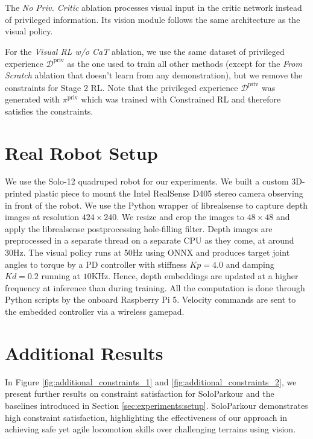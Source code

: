 The \textit{No Priv. Critic} ablation processes visual input in the critic network instead of privileged information.
Its vision module follows the same architecture as the visual policy.

For the \textit{Visual RL w/o CaT} ablation, we use the same dataset of privileged experience $\mathcal{D}^\text{priv}$ as the one used to train all other methods (except for the \textit{From Scratch} ablation that doesn't learn from any demonstration), but we remove the constraints for Stage 2 RL.
Note that the privileged experience $\mathcal{D}^\text{priv}$ was generated with $\pi^\text{priv}$ which was trained with Constrained RL and therefore satisfies the constraints.



\section{Real Robot Setup}
We use the Solo-12 quadruped robot for our experiments.
We built a custom 3D-printed plastic piece to mount the Intel RealSense D405 stereo camera observing in front of the robot.
We use the Python wrapper of librealsense to capture depth images at resolution $424 \times 240$.
We resize and crop the images to $48 \times 48$ and apply the librealsense postprocessing hole-filling filter.
Depth images are preprocessed in a separate thread on a separate CPU as they come, at around 30Hz.
The visual policy runs at 50Hz using ONNX and produces target joint angles to torque by a PD controller with stiffness $Kp=4.0$ and damping $Kd=0.2$ running at $10$KHz.
Hence, depth embeddings are updated at a higher frequency at inference than during training.
All the computation is done through Python scripts by the onboard Raspberry Pi 5. 
Velocity commands are sent to the embedded controller via a wireless gamepad.


\section{Additional Results}
\label{appendix:additional_results}


In Figure \ref{fig:additional_constraints_1} and \ref{fig:additional_constraints_2}, we present further results on constraint satisfaction for SoloParkour and the baselines introduced in Section \ref{sec:experiments:setup}.
SoloParkour demonstrates high constraint satisfaction, highlighting the effectiveness of our approach in achieving safe yet agile locomotion skills over challenging terrains using vision.



